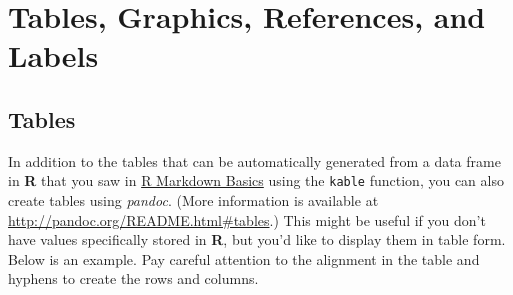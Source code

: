 \documentclass[12pt,twoside]{Mactemplate}
\theoremstyle{definition}
\theoremstyle{definition}
\theoremstyle{definition}
\theoremstyle{remark}
\begin{document}
\chapter{Tables, Graphics, References, and Labels}\label{ref-labels}

\section{Tables}\label{tables}

In addition to the tables that can be automatically generated from a
data frame in \textbf{R} that you saw in
\protect\hyperlink{rmd-basics}{R Markdown Basics} using the
\texttt{kable} function, you can also create tables using \emph{pandoc}.
(More information is available at
\url{http://pandoc.org/README.html\#tables}.) This might be useful if
you don't have values specifically stored in \textbf{R}, but you'd like
to display them in table form. Below is an example. Pay careful
attention to the alignment in the table and hyphens to create the rows
and columns.
\end{document}
